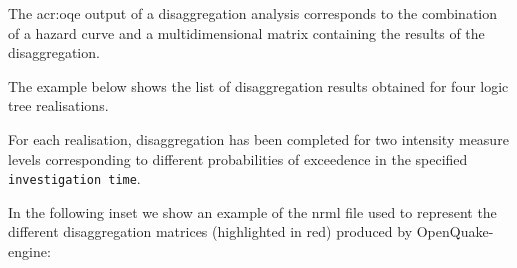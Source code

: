 The \gls{acr:oqe} output of a disaggregation analysis corresponds to the
combination of a hazard curve and a multidimensional matrix containing the
results of the disaggregation.

The example below shows the list of disaggregation results obtained for four
logic tree realisations.

For each realisation, disaggregation has been completed for two intensity
measure levels corresponding to different probabilities of exceedence in the
specified \texttt{investigation time}.



In the following inset we show an example of the nrml file used to represent
the different disaggregation matrices (highlighted in red) produced by
OpenQuake-engine:

